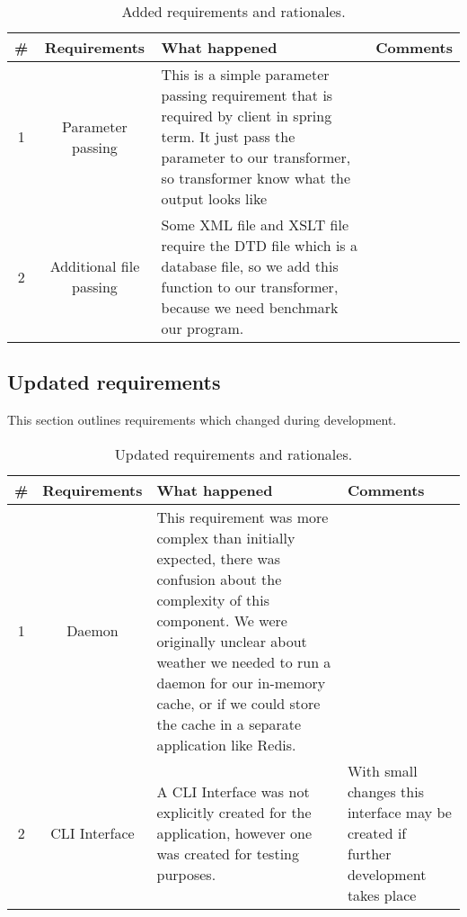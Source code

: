 \begin{table}[H]
  \begin{center}
    \begin{tabular}{ | c | c | p{7cm} | p{6cm} | }
      \hline 
      \# & Requirements & What happened & Comments \\ \hline
      1 & Parameter passing & This is a simple parameter passing requirement that is required by client in spring term. It just pass the parameter to our transformer, so transformer know what the output looks like & \\ \hline
      2 & Additional file passing & Some XML file and XSLT file require the DTD file which is a database file, so we add this function to our transformer, because we need benchmark our program.& \\ \hline
    \end{tabular}
  \end{center}
  \caption{Added requirements and rationales.}
\end{table}

\subsection{Updated requirements}

This section outlines requirements which changed during development.

\begin{table}[H]
  \begin{center}
    \begin{tabular}{ | c | c | p{7cm} | p{6cm} | }
      \hline
      \# & Requirements & What happened & Comments \\ \hline
      1 & Daemon & This requirement was more complex than initially expected, there was confusion about the complexity of this component. We were originally unclear about weather we needed to run a daemon for our in-memory cache, or if we could store the cache in a separate application like Redis. & \\ \hline
      2 & CLI Interface & A CLI Interface was not explicitly created for the application, however one was created for testing purposes. & With small changes this interface may be created if further development takes place \\ \hline
    \end{tabular}
  \end{center}
  \caption{Updated requirements and rationales.}
\end{table}

